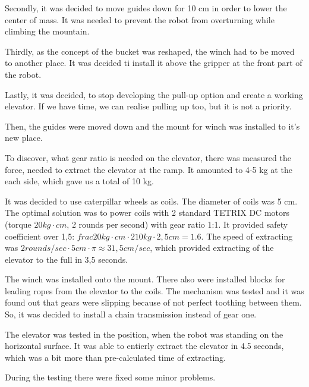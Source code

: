 \begin{enumerate*}
\begin{enumerate*}
  	\item Secondly, it was decided to move guides down for 10 cm in order to lower the center of mass. It was needed to prevent the robot from overturning while climbing the mountain.
  	
  	\item Thirdly, as the concept of the bucket was reshaped, the winch had to be moved to another place. It was decided ti install it above the gripper at the front part of the robot.
  	
  	\item Lastly, it was decided, to stop developing the pull-up option and create a working elevator. If we have time, we can realise pulling up too, but it is not a priority.
  	
  \end{enumerate*}

  \item Then, the guides were moved down and the mount for winch was installed to it's new place.

  \item To discover, what gear ratio is needed on the elevator, there was measured the force, needed to extract the elevator at the ramp. It amounted to 4-5 kg at the each side, which gave us a total of 10 kg.

  It was decided to use caterpillar wheels as coils. The diameter of coils was 5 cm. The optimal solution was to power coils with 2 standard TETRIX DC motors (torque $20 kg \cdot cm$, 2 rounds per second) with gear ratio 1:1. It provided safety coefficient over 1,5: $frac{20 kg \cdot cm \cdot 2}{10 kg \cdot 2,5 cm} = 1.6$. The speed of extracting was $2 rounds / sec \cdot 5 cm \cdot \pi \approx 31,5 cm / sec$, which provided extracting of the elevator to the full in 3,5 seconds.

  \item The winch was installed onto the mount. There also were installed blocks for leading ropes from the elevator to the coils. The mechanism was tested and it was found out that gears were slipping because of not perfect toothing between them. So, it was decided to install a chain transmission instead of gear one.

  \item The elevator was tested in the position, when the robot was standing on the horizontal surface. It was able to entierly extract the elevator in 4.5 seconds, which was a bit more than pre-calculated time of extracting.

  During the testing there were fixed some minor problems.
  \begin{enumerate*}
  	

\end{enumerate*}
\end{enumerate*}
